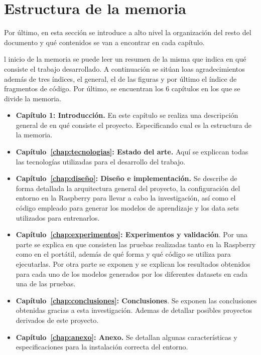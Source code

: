 \documentclass[a4paper, 12pt]{book}
\begin{document}
\section{Estructura de la memoria}
\label{sec:estructura}

Por último, en esta sección se introduce a alto nivel la organización del resto del documento
y qué contenidos se van a encontrar en cada capítulo.

l inicio de la memoria se puede leer un resumen de la misma que indica en qué consiste el trabajo desarrollado. A continuación se sitúan loas agradecimientos además de tres índices, el general, el de las figuras y por último el índice de fragmentos de código. Por último, se encuentran los 6 capítulos en los que se divide la memoria.

\begin{itemize}

    \item \textbf{Capítulo 1: Introducción.} En este capítulo se realiza una descripción general de en qué consiste el proyecto. Especificando cual es la estructura de la memoria.
    \item \textbf{Capítulo~\ref{chap:tecnologias}: Estado del arte.} Aquí se expliccan todas las tecnologías utilizadas para el desarrollo del trabajo.
    \item \textbf{Capítulo~\ref{chap:diseño}: Diseño e implementación.} Se describe de forma detallada la arquitectura general del proyecto, la configuración del entorno en la Raspberry para llevar a cabo la investigación, así como el código empleado para generar los modelos de aprendizaje y los data sets utilizados para entrenarlos.
    \item \textbf{Capítulo~\ref{chap:experimentos}: Experimentos y validación}. Por una parte se explica en que consisten las pruebas realizadas tanto en la Raspberry como en el portátil, además de qué forma y qué código se utiliza para ejecutarlas. Por otra parte se exponen y se explican los resultados obtenidos para cada uno de los modelos generados por los diferentes datasets en cada una de las pruebas.
    \item \textbf{Capítulo~\ref{chap:conclusiones}: Conclusiones}. Se exponen las conclusiones obtenidas gracias a esta investigación. Ademas de detallar posibles proyectos derivados de este proyecto.
    \item \textbf{Capítulo~\ref{chap:anexo}: Anexo.} Se detallan algunas características y especificaciones para la instalación correcta del entorno.
\end{itemize}
\end{document}
